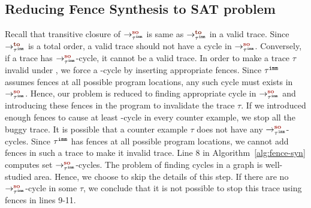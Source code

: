 \subsection{Reducing Fence Synthesis to SAT problem}
Recall that transitive closure of $ \so{\imm{\tau}}{}{} $ is same as 
$ \to{\imm{\tau}}{}{} $ in a valid \cc trace. Since  
$ \to{\imm{\tau}}{}{} $ is a total order, a valid \cc trace should not 
have a cycle in $ \so{\imm{\tau}}{}{} $. Conversely, if a trace has 
$ \so{\imm{\tau}}{}{} $-cycle, it cannot be a valid \cc trace. 
In order to make a trace $ \tau $ invalid under \cc, we force a \lso-cycle by inserting appropriate fences. 
Since $ {\tau}^{\mathtt{imm}} $ assumes \mosc fences at all possible program locations,
any such cycle must exists in $ \so{\imm{\tau}}{}{} $. 
Hence, our problem is reduced to finding appropriate cycle in 
$\so{\imm{\tau}}{}{} $ and introducing these fences in the program to 
invalidate the trace $ \tau $.
If we introduced enough fences to cause at least \lso-cycle in 
every counter example, we stop all the buggy trace. 
It is possible that a counter example $ \tau $ does not have any 
$\so{\imm{\tau}}{}{}$-cycles. Since $ {\tau}^{\mathtt{imm}} $ has \mosc fences at all 
possible program locations, we cannot add fences in such a trace to 
make it invalid \cc trace. 
Line 8 in Algorithm~\ref{alg:fence-syn} computes set $\so{\imm{\tau}}{}{}$-cycles. 
The problem of finding cycles in a graph is well-studied area. Hence, we 
choose to skip the details of this step.
If there are no $\so{\imm{\tau}}{}{}$-cycle in some $ \tau $, we conclude 
that it is not possible to stop this trace using \cc fences in lines 
9-11.


